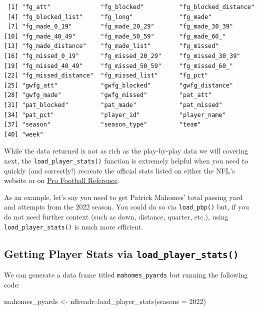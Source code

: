 \documentclass[
  letterpaper,
]{krantz}
\newenvironment{Shaded}{\begin{snugshade}}{\end{snugshade}}
\newcommand{\AttributeTok}[1]{\textcolor[rgb]{0.40,0.45,0.13}{#1}}
\newcommand{\DecValTok}[1]{\textcolor[rgb]{0.68,0.00,0.00}{#1}}
\newcommand{\FunctionTok}[1]{\textcolor[rgb]{0.28,0.35,0.67}{#1}}
\newcommand{\NormalTok}[1]{\textcolor[rgb]{0.00,0.23,0.31}{#1}}
\newcommand{\OtherTok}[1]{\textcolor[rgb]{0.00,0.23,0.31}{#1}}
\newcommand{\SpecialCharTok}[1]{\textcolor[rgb]{0.37,0.37,0.37}{#1}}
\begin{document}
\begin{verbatim}
 [1] "fg_att"              "fg_blocked"          "fg_blocked_distance"
 [4] "fg_blocked_list"     "fg_long"             "fg_made"            
 [7] "fg_made_0_19"        "fg_made_20_29"       "fg_made_30_39"      
[10] "fg_made_40_49"       "fg_made_50_59"       "fg_made_60_"        
[13] "fg_made_distance"    "fg_made_list"        "fg_missed"          
[16] "fg_missed_0_19"      "fg_missed_20_29"     "fg_missed_30_39"    
[19] "fg_missed_40_49"     "fg_missed_50_59"     "fg_missed_60_"      
[22] "fg_missed_distance"  "fg_missed_list"      "fg_pct"             
[25] "gwfg_att"            "gwfg_blocked"        "gwfg_distance"      
[28] "gwfg_made"           "gwfg_missed"         "pat_att"            
[31] "pat_blocked"         "pat_made"            "pat_missed"         
[34] "pat_pct"             "player_id"           "player_name"        
[37] "season"              "season_type"         "team"               
[40] "week"               
\end{verbatim}

While the data returned is not as rich as the play-by-play data we will
covering next, the \texttt{load\_player\_stats()} function is extremely
helpful when you need to quickly (and correctly!) recreate the official
stats listed on either the NFL's website or on
\href{https://www.pro-football-reference.com/}{Pro Football Reference}.

As an example, let's say you need to get Patrick Mahomes' total passing
yard and attempts from the 2022 season. You could do so via
\texttt{load\_pbp()} but, if you do not need further context (such as
down, distance, quarter, etc.), using \texttt{load\_player\_stats()} is
much more efficient.

\hypertarget{getting-player-stats-via-load_player_stats}{%
\subsection{\texorpdfstring{Getting Player Stats via
\texttt{load\_player\_stats()}}{Getting Player Stats via load\_player\_stats()}}\label{getting-player-stats-via-load_player_stats}}

We can generate a data frame titled \texttt{mahomes\_pyards} but running
the following code:

\begin{Shaded}
\begin{Highlighting}[]
\NormalTok{mahomes\_pyards }\OtherTok{\textless{}{-}}\NormalTok{ nflreadr}\SpecialCharTok{::}\FunctionTok{load\_player\_stats}\NormalTok{(}\AttributeTok{seasons =} \DecValTok{2022}\NormalTok{)}
\end{Highlighting}
\end{Shaded}
\end{document}
